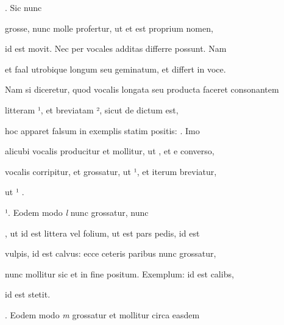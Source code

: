 \indentP {}. Sic  nunc

\fulllines

grosse, nunc molle profertur, ut  et est proprium nomen, 

id est movit. Nec per vocales additas differre possunt. Nam 

et faal utrobique  longum seu geminatum, et  differt in voce.

Nam si diceretur, quod vocalis longata seu producta faceret consonantem



litteram ¹, et breviatam ², sicut de  dictum est,

hoc apparet falsum in exemplis statim positis:  . Imo

alicubi vocalis producitur et  mollitur, ut , et e converso,

vocalis corripitur, et  grossatur, ut ¹, et iterum  breviatur,


\splitlines

ut ¹   .


\indentK {}¹. Eodem modo \textit{l} nunc grossatur, nunc 

\fulllines

, ut  id est littera vel folium,  ut est pars pedis,  id est

vulpis,   id est calvus: ecce ceteris paribus nunc grossatur,

nunc mollitur sic et in fine positum. Exemplum:  id est calibs,

\splitlines

 id est stetit.

\indentK {}. Eodem modo \textit{m} grossatur et mollitur circa easdem

\fulllines

